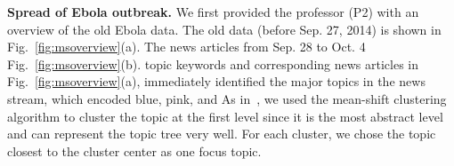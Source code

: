 \noindent \textbf{\normalsize Spread of Ebola outbreak.}
We first provided the professor (P2) with an overview of the old Ebola data.
The old data (before Sep. 27, 2014) is shown in Fig.~\ref{fig:msoverview}(a).
The news articles from Sep. 28 to Oct. 4  Fig.~\ref{fig:msoverview}(b).
 topic keywords and corresponding news articles in Fig.~\ref{fig:msoverview}(a), %
 immediately identified the major topics in the news stream, which  encoded  blue, pink, and 
As in~\cite{cui2014}, we used the mean-shift clustering algorithm to cluster the topic at the first level since it is the most abstract level and can represent the topic tree very well.
For each cluster, we chose the topic closest to the cluster center as one focus topic.


